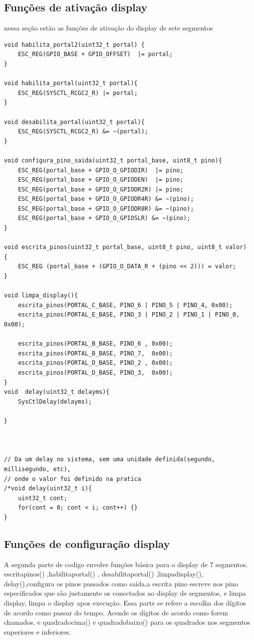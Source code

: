 \documentclass{article}
\begin{document}
\subsection{Funções de ativação display}
nessa seção estão as funções de ativação do display de sete segmentos

\begin{lstlisting}
void habilita_portal2(uint32_t portal) {
    ESC_REG(GPIO_BASE + GPIO_OFFSET)  |= portal;
}

void habilita_portal(uint32_t portal){
    ESC_REG(SYSCTL_RCGC2_R) |= portal;
}

void desabilita_portal(uint32_t portal){
    ESC_REG(SYSCTL_RCGC2_R) &= ~(portal);
}

void configura_pino_saida(uint32_t portal_base, uint8_t pino){
    ESC_REG(portal_base + GPIO_O_GPIODIR)  |= pino;
    ESC_REG(portal_base + GPIO_O_GPIODEN)  |= pino;
    ESC_REG(portal_base + GPIO_O_GPIODR2R) |= pino;
    ESC_REG(portal_base + GPIO_O_GPIODR4R) &= ~(pino);
    ESC_REG(portal_base + GPIO_O_GPIODR8R) &= ~(pino);
    ESC_REG(portal_base + GPIO_O_GPIOSLR) &= ~(pino);
}

void escrita_pinos(uint32_t portal_base, uint8_t pino, uint8_t valor) {
    ESC_REG (portal_base + (GPIO_O_DATA_R + (pino << 2))) = valor;
}

void limpa_display(){
    escrita_pinos(PORTAL_C_BASE, PINO_6 | PINO_5 | PINO_4, 0x00);
    escrita_pinos(PORTAL_E_BASE, PINO_3 | PINO_2 | PINO_1 | PINO_0, 0x00);

    escrita_pinos(PORTAL_B_BASE, PINO_6 , 0x00);
    escrita_pinos(PORTAL_B_BASE, PINO_7,  0x00);
    escrita_pinos(PORTAL_D_BASE, PINO_2 , 0x00);
    escrita_pinos(PORTAL_D_BASE, PINO_3,  0x00);
}
void  delay(uint32_t delayms){
    SysCtlDelay(delayms);

}



// Da um delay no sistema, sem uma unidade definida(segundo, millisegundo, etc),
// onde o valor foi definido na pratica
/*void delay(uint32_t i){
    uint32_t cont;
    for(cont = 0; cont < i; cont++) {}
}

\end{lstlisting}

\subsection{ Funções de configuração display}

A segunda parte de codigo envolve funções básica para o display de 7 segmentos. escritapinos() ,habilitaportal() , desabilitaportal() ,limpadisplay(), delay(),configura os pinos passados como saída,a escrita pino escreve nos pino especificados que são justamente os conectados ao display de  segmentos, e limpa  display, limpa o display apos execução.
Essa parte se refere a escolha dos dígitos de acordo como passar do tempo. Acende os dígitos de acordo como forem chamados, e quadradocima() e quadradobaixo() para os quadrados nos segmentos superiores e inferiores. 
\end{document}

